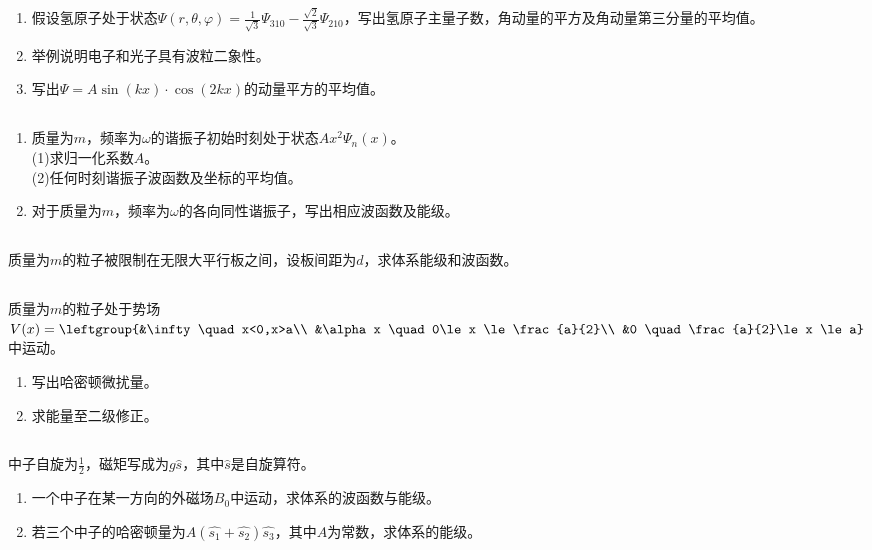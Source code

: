 
\subsection{ }
\begin{enumerate}
\item 假设氢原子处于状态$\Psi (r,\theta,\varphi)=\frac{1}{\sqrt{3}}\Psi_{310}-\frac{\sqrt{2}}{\sqrt{3}}\Psi_{210}$，写出氢原子主量子数，角动量的平方及角动量第三分量的平均值。
\item 举例说明电子和光子具有波粒二象性。
\item 写出$\Psi = A \sin(kx)\cdot\cos(2kx)$的动量平方的平均值。
\end{enumerate}
\subsection{ }
\begin{enumerate}
\item 质量为$m$，频率为$\omega$的谐振子初始时刻处于状态$Ax^2\Psi_n(x)$。\\
(1)求归一化系数$A$。\\
(2)任何时刻谐振子波函数及坐标的平均值。
\item 对于质量为$m$，频率为$\omega$的各向同性谐振子，写出相应波函数及能级。
\end{enumerate}
\subsection{ }
质量为$m$的粒子被限制在无限大平行板之间，设板间距为$d$，求体系能级和波函数。
\subsection{ }
质量为$m$的粒子处于势场$V(x)=\leftgroup{&\infty \quad x<0,x>a\\ &\alpha x \quad 0\le x \le \frac{a}{2}\\ &0 \quad \frac{a}{2}\le x \le a} $中运动。
\begin{enumerate}
\item 写出哈密顿微扰量。
\item 求能量至二级修正。
\end{enumerate}
\subsection{ }
中子自旋为$\frac{1}{2}$，磁矩写成为$g\hat{s}$，其中$\hat{s}$是自旋算符。
\begin{enumerate}
\item 一个中子在某一方向的外磁场$B_0$中运动，求体系的波函数与能级。
\item 若三个中子的哈密顿量为$A(\hat{s_1}+\hat{s_2})\hat{s_3} $，其中$A$为常数，求体系的能级。
\end{enumerate}
